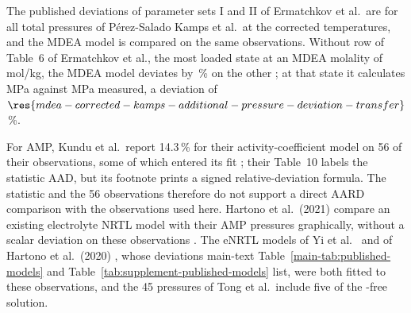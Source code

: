 \documentclass[a4paper,11pt]{article}
\begin{document}
The published deviations of parameter sets I and II of Ermatchkov et al.\ are for all  total pressures of P\'erez-Salado Kamps et al.\ at the corrected temperatures, and the MDEA model is compared on the same observations.
Without row  of Table~6 of Ermatchkov et al., the most loaded state at an MDEA molality of  mol/kg, the MDEA model deviates by \,\% on the other ; at that state it calculates  MPa against  MPa measured, a deviation of $\res{mdea-corrected-kamps-additional-pressure-deviation-transfer}$\,\%.

For AMP, Kundu et al.\ report 14.3\,\% for their activity-coefficient model on 56 of their observations, some of which entered its fit \cite{kunduVaporLiquidEquilibriumCO22003}; their Table~10 labels the statistic AAD, but its footnote prints a signed relative-deviation formula. The statistic and the 56 observations therefore do not support a direct AARD comparison with the  observations used here.
Hartono et al.\ (2021) compare an existing electrolyte NRTL model with their AMP pressures graphically, without a scalar deviation on these observations \cite{hartonoNewSolubilityHeat2021}.
The eNRTL models of Yi et al.\ \cite{yiOpenAccessThermodynamically2024} and of Hartono et al.\ (2020) \cite{hartonoSolubilityCO201M2020}, whose deviations main-text Table~\ref{main-tab:published-models} and Table~\ref{tab:supplement-published-models} list, were both fitted to these observations, and the 45 pressures of Tong et al.\ include five of the \COtwo-free solution.
\end{document}
